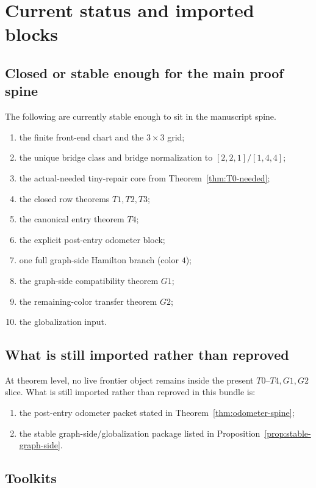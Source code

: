 \documentclass[11pt]{article}
\newcommand{\CanL}{[2,2,1]}
\newcommand{\CanR}{[1,4,4]}
\newcommand{\CanSeed}{\CanL/\CanR}
\begin{document}
\section{Current status and imported blocks}

\subsection{Closed or stable enough for the main proof spine}

The following are currently stable enough to sit in the manuscript spine.
\begin{enumerate}[label=\textup{(\arabic*)},leftmargin=2.8em]
\item the finite front-end chart and the \(3\times 3\) grid;
\item the unique bridge class and bridge normalization to \(\CanSeed\);
\item the actual-needed tiny-repair core from Theorem~\ref{thm:T0-needed};
\item the closed row theorems \(T1,T2,T3\);
\item the canonical entry theorem \(T4\);
\item the explicit post-entry odometer block;
\item one full graph-side Hamilton branch (color $4$);
\item the graph-side compatibility theorem \(G1\);
\item the remaining-color transfer theorem \(G2\);
\item the globalization input.
\end{enumerate}

\subsection{What is still imported rather than reproved}

At theorem level, no live frontier object remains inside the present
\(T0\)--\(T4,G1,G2\) slice.
What is still imported rather than reproved in this bundle is:
\begin{enumerate}[label=\textup{(\arabic*)},leftmargin=2.8em]
\item the post-entry odometer packet stated in Theorem~\ref{thm:odometer-spine};
\item the stable graph-side/globalization package listed in
      Proposition~\ref{prop:stable-graph-side}.
\end{enumerate}

\subsection{Toolkits}
\end{document}
